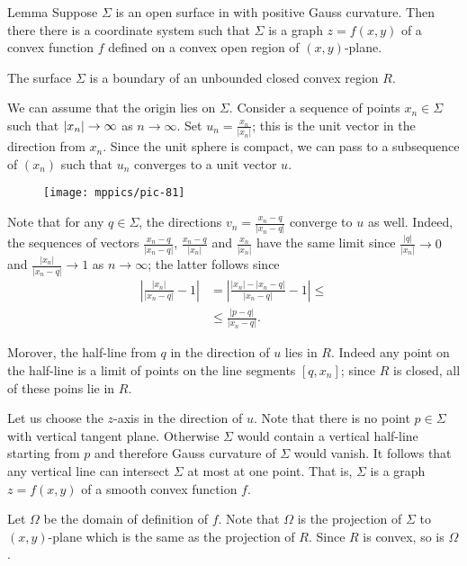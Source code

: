 \begin{thm}{Lemma}\label{lem:graph}
Suppose $\Sigma$ is an open surface in with positive Gauss curvature.
Then there there is a coordinate system such that 
$\Sigma$ is a graph $z=f(x,y)$ of a convex function $f$ defined on a convex open region of $(x,y)$-plane.
\end{thm}

The surface $\Sigma$ is a boundary of an unbounded closed convex region $R$.

We can assume that the origin lies on $\Sigma$.
Consider a sequence of points $x_n\in \Sigma$ such that $|x_n|\z\to \infty$ as $n\to \infty$.
Set $u_n=\tfrac{x_n}{|x_n|}$; this is the unit vector in the direction from $x_n$.
Since the unit sphere is compact, we can pass to a subsequence of $(x_n)$ such that $u_n$ converges to a unit vector $u$.

\begin{wrapfigure}[15]{o}{28 mm}
\vskip-0mm
\centering
\texttt{[image: mppics/pic-81]}
\vskip-0mm
\end{wrapfigure}

Note that for any $q\in \Sigma$, the directions $v_n=\tfrac{x_n-q}{|x_n-q|}$ converge to $u$ as well.
Indeed, the sequences of vectors $\tfrac{x_n-q}{|x_n-q|}$, $\tfrac{x_n-q}{|x_n|}$ and 
$\tfrac{x_n}{|x_n|}$ have the same limit since $\tfrac{|q|}{|x_n|}\to 0$
and $\tfrac{|x_n|}{|x_n-q|}\to 1$ as $n\to \infty$;
the latter follows since
\begin{align*}
|\tfrac{|x_n|}{|x_n-q|}-1|&=|\tfrac{|x_n|-|x_n-q|}{|x_n-q|}-1|\le
\\
&\le\tfrac{|p-q|}{|x_n-q|}.
\end{align*}

Morover, the half-line from $q$ in the direction of $u$ lies in $R$.
Indeed any point on the half-line is a limit of points on the line segments $[q,x_n]$;
since $R$ is closed, all of these poins lie in $R$.


Let us choose the $z$-axis in the direction of $u$.
Note that there is no point $p\in\Sigma$ with vertical tangent plane.
Otherwise $\Sigma$ would contain a vertical half-line starting from $p$ and therefore Gauss curvature of $\Sigma$ would vanish.
It follows that any vertical line can intersect $\Sigma$ at most at one point.
That is, $\Sigma$ is a graph $z=f(x,y)$ of a smooth convex function $f$.

Let $\Omega$ be the domain of definition of $f$.
Note that $\Omega$ is the projection of $\Sigma$ to $(x,y)$-plane 
which is the same as the projection of $R$.
Since $R$ is convex, so is $\Omega$.

